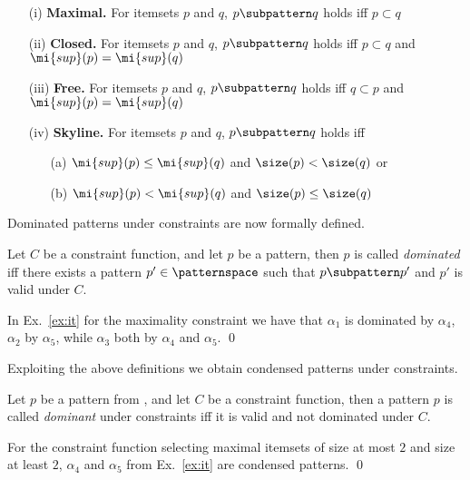 \begin{itemize}
    \item[(i)] \textbf{Maximal.} For itemsets $p$ and $q$, $p \subpattern q$ holds iff $p \subset q$
    \item[(ii)] \textbf{Closed.} For itemsets $p$ and $q$, $p \subpattern q$ holds iff $p \subset q$ and  $\mi{sup}(p) = \mi{sup}(q)$ 
    \item[(iii)] \textbf{Free.} For itemsets $p$ and $q$, $p \subpattern q$ holds iff $q \subset p$ and $\mi{sup}(p) = \mi{sup}(q)$ 
    \item[(iv)] \textbf{Skyline.} For itemsets $p$ and $q$, $p \subpattern q$ holds iff 
        \begin{itemize}
            \item[(a)] $\mi{sup}(p) \leq \mi{sup}(q)$ and $\size(p) < \size(q)$ or 
            \item[(b)] $\mi{sup}(p) < \mi{sup}(q) $ and $\size(p) \leq \size(q)$
        \end{itemize}
\end{itemize}

Dominated patterns under constraints are now formally defined.

\begin{definition}\label{def:dom}
    Let $C$ be a constraint function, and let $p$ be a pattern, then $p$ is called \emph{dominated} iff there exists a pattern $p' \in \patternspace$ such that $p \subpattern p'$ and $p'$ is valid under $C$.
\end{definition}

\begin{example}
    In Ex.~\ref{ex:it} for the maximality constraint we have that $\alpha_1$ is dominated by $\alpha_4$, $\alpha_2$ by $\alpha_5$, while $\alpha_3$ both by $\alpha_4$ and $\alpha_5$. \qed
\end{example}

Exploiting the above definitions we obtain condensed patterns under constraints.

\begin{definition}\label{def:con}
    Let $p$ be a pattern from \patternspace, and let $C$ be a constraint function, then a pattern $p$ is called \emph{dominant} under constraints iff it is valid and not dominated under $C$. 
\end{definition}
 \begin{example}
     For the constraint function selecting maximal itemsets of size at most $2$ and %
     size at least $2$, $\alpha_4$ and $\alpha_5$ from Ex.~\ref{ex:it} are condensed patterns. \qed
 \end{example}

